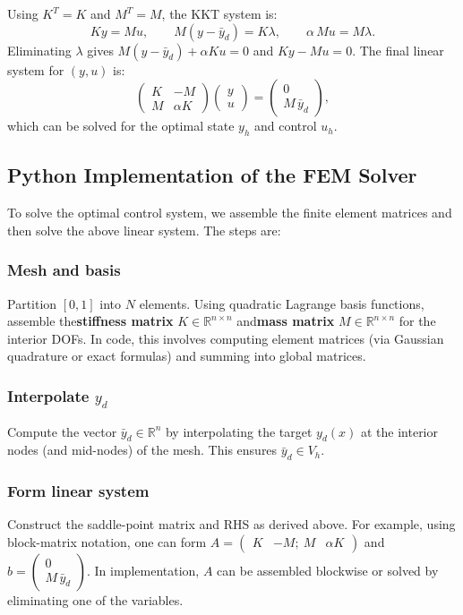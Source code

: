 Using \(K^T=K\) and \(M^T=M\), the KKT system is:
\[ K y = M u, \qquad M(y-\bar y_d) = K\lambda, \qquad \alpha\,M u = M\lambda. \]
Eliminating \(\lambda\) gives \(M(y-\bar y_d) + \alpha K u = 0\) and \(K y - M u = 0\). The final linear system for \((y,u)\) is:
\[ \begin{pmatrix}K & -M\\ M & \alpha K\end{pmatrix}\begin{pmatrix}y\\ u\end{pmatrix} = \begin{pmatrix}0\\ M\,\bar y_d\end{pmatrix}, \]
which can be solved for the optimal state \(y_h\) and control \(u_h\).

\subsection{Python Implementation of the FEM Solver}
To solve the optimal control system, we assemble the finite element matrices and then solve the above linear system. The steps are:

\subsubsection{Mesh and basis}
Partition \([0,1]\) into \(N\) elements. Using quadratic Lagrange basis functions, assemble the\textbf{stiffness matrix} \(K\in\mathbb{R}^{n\times n}\) and\textbf{mass matrix} \(M\in\mathbb{R}^{n\times n}\) for the interior DOFs. In code, this involves computing element matrices (via Gaussian quadrature or exact formulas) and summing into global matrices.

\subsubsection{Interpolate \(y_d\)}
Compute the vector \(\bar y_d\in\mathbb{R}^n\) by interpolating the target \(y_d(x)\) at the interior nodes (and mid-nodes) of the mesh. This ensures \(\bar y_d \in V_h\).

\subsubsection{Form linear system}
Construct the saddle-point matrix and RHS as derived above. For example, using block-matrix notation, one can form \(A = \begin{pmatrix}K & -M;~M & \alpha K\end{pmatrix}\) and \(b = \begin{pmatrix}0 \\ M\,\bar y_d\end{pmatrix}\). In implementation, \(A\) can be assembled blockwise or solved by eliminating one of the variables.

